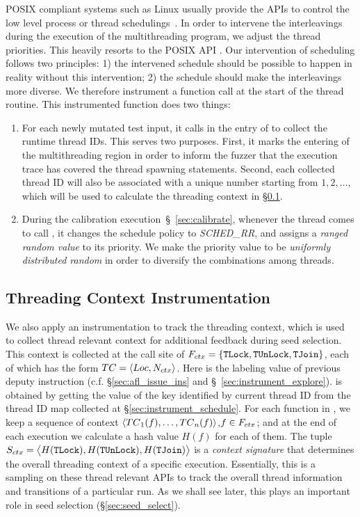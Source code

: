 POSIX compliant systems such as Linux
usually provide the APIs to control the low level process or thread schedulings~\cite{posixstd,tlpi}.
In order to intervene the interleavings during the execution of the multithreading program, we adjust the thread priorities.
This heavily resorts to the POSIX API . Our intervention of scheduling follows two principles: 1) the intervened schedule should be possible to happen in reality without this intervention; 2) the schedule should make the interleavings more diverse. We therefore instrument a function call \rtifunc at the start of the thread routine. This instrumented function does two things:
\begin{enumerate}[(1)]
    \item For each newly mutated test input, it calls  in the entry of \FSStart to collect the runtime thread IDs. This serves two purposes.
    First, it marks the entering of the multithreading region in order to inform the fuzzer that the execution trace has covered the thread spawning statements.
    Second, each collected thread ID will also be associated with a unique number \ntid starting from $1,2,\ldots$, which will be used to calculate the threading context in \S\ref{sec:instrument_thread_ctx}.
    \item During the calibration execution~\S~\ref{sec:calibrate}, whenever the thread comes to call \rtifunc, it changes the schedule policy to \emph{SCHED\_RR}, and assigns a \emph{ranged random value} to its priority.
    We make the priority value to be \emph{uniformly distributed random} in order to diversify the combinations among threads.
\end{enumerate}

\subsection{Threading Context Instrumentation}\label{sec:instrument_thread_ctx}
We also apply an instrumentation to track the threading context, which is used to collect thread relevant context for additional feedback during seed selection.
This context is collected at the call site of $F_{ctx}=\{\texttt{TLock}, \texttt{TUnLock}, \texttt{TJoin}\}$, each of which has the form $TC=\langle Loc, N_{ctx}\rangle$. Here \iloc is the labeling value of previous deputy instruction (c.f. \S\ref{sec:afl_issue_ins} and \S~\ref{sec:instrument_explore}). \ntid is obtained by getting the value of the key identified by current thread ID from the thread ID map collected at \S\ref{sec:instrument_schedule}. For each function in \FSThread, we keep a sequence of context $\langle TC{_1}(f),\ldots,TC{_n}(f)\rangle$,$f\in F_{ctx}$; and at the end of each execution we calculate a hash value $H(f)$ for each of them. The tuple ${S}_{ctx}=\big\langle H(\texttt{TLock}),H(\texttt{TUnLock}),H(\texttt{TJoin})\big\rangle$ is a \emph{context signature} that determines the overall threading context of a specific execution. Essentially, this is a sampling on these thread relevant APIs to track the overall thread information and transitions of a particular run. As we shall see later, this plays an important role in seed selection (\S\ref{sec:seed_select}).

